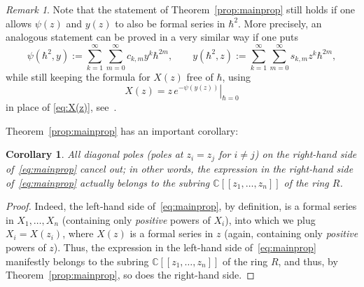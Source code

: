 \documentclass[JEP,XML,SOM,Unicode,NoEqCountersInSection,NoFloatCountersInSection]{cedram}
\newcommand{\llbracket}{[\![}
\newcommand{\rrbracket}{]\!]}
\theoremstyle{plain}
\newtheorem{corollary}[theorem]{Corollary}
\theoremstyle{definition}
\theoremstyle{remark}
\newtheorem{remark}[theorem]{Remark}
\begin{document}
\begin{remark} \label{rem:DHdeformed}
Note that the statement of Theorem~\ref{prop:mainprop} still holds if one allows $\psi(z)$ and $y(z)$ to also be formal series in $\hbar^2$. More precisely, an analogous statement can be proved in a very similar way if one puts
\[
\psi(\hbar^2,y):=\sum_{k=1}^\infty\sum_{m=0}^\infty c_{k,m} y^k\hbar^{2m},\qquad
y(\hbar^2,z):=\sum_{k=1}^\infty\sum_{m=0}^\infty s_{k,m} z^k\hbar^{2m},
\]
while still keeping the formula for $X(z)$ free of $\hbar$, \ie using
\begin{equation*}
X(z)=\left.z\,e^{-\psi(y(z))}\right|_{\hbar=0}
\end{equation*}
in place of \eqref{eq:X(z)}, see~\cite[\S 2]{BDKS21toprec}.
\end{remark}

Theorem~\ref{prop:mainprop} has an important corollary:

\begin{corollary}\label{cor:diagonal}
All diagonal poles (\ie poles at $z_i=z_j$ for $i\neq j$) on the right-hand side of~\eqref{eq:mainprop} cancel out; in other words, the expression in the right-hand side of~\eqref{eq:mainprop} actually belongs to the subring $\mathbb{C}\llbracket z_1,\dots,z_n\rrbracket $ of the ring $R$.
\end{corollary}
\begin{proof}
Indeed, the left-hand side of~\eqref{eq:mainprop}, by definition, is a formal series in $X_1,\dots,X_n$ (containing only \emph{positive} powers of $X_i$), into which we plug $X_i=X(z_i)$, where $X(z)$ is a formal series in $z$ (again, containing only \emph{positive} powers of $z$). Thus, the expression in the left-hand side of~\eqref{eq:mainprop} manifestly belongs to the subring $\mathbb{C}\llbracket z_1,\dots,z_n\rrbracket $ of the ring $R$, and thus, by Theorem~\ref{prop:mainprop}, so does the right-hand side.
\end{proof}
\end{document}
